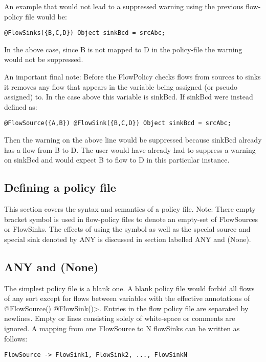 An example that would not lead to a suppressed warning
using the previous flow-policy file would be:

\begin{Verbatim}
@FlowSinks({B,C,D}) Object sinkBcd = srcAbc;
\end{Verbatim}

In the above case, since B is not mapped to D in the
policy-file the warning would not be suppressed.

An important final note:
Before the FlowPolicy checks flows from sources to sinks
it removes any flow that appears in the variable being assigned
(or pseudo assigned) to.  In the case above this variable is
sinkBcd.  If sinkBcd were instead defined as:
\begin{Verbatim}
@FlowSource({A,B}) @FlowSink({B,C,D}) Object sinkBcd = srcAbc;
\end{Verbatim}
Then the warning on the above line would be suppressed because
sinkBcd already has a flow from B to D.  The user would have
already had to suppress a warning on sinkBcd and would expect
B to flow to D in this particular instance.

\subsection{Defining a policy file}
This section covers the syntax and semantics of a policy file.
Note:  There empty bracket symbol {} is used in flow-policy
files to denote an empty-set of FlowSources or FlowSinks.
The effects of using the {} symbol  as well as the special
source and special sink denoted by ANY is discussed in
section labelled ANY and {} (None).

\subsection{ANY and {} (None)} \label{sec:any-none}

The simplest policy file is a blank one.  A blank policy
file would forbid all flows of any sort except for flows
between variables with the effective annotations of
\<@FlowSource({}) @FlowSink({})>.  Entries in the flow policy
file are separated by newlines.  Empty or lines consisting
solely of white-space or comments are ignored.  A mapping from
one FlowSource to N flowSinks can be written as follows:
\begin{Verbatim}
FlowSource -> FlowSink1, FlowSink2, ..., FlowSinkN
\end{Verbatim}

